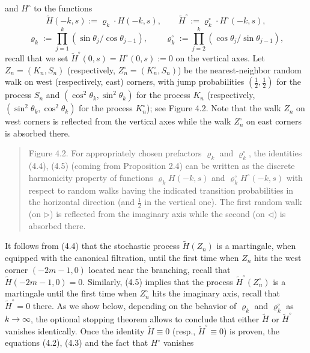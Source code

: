 \documentclass[11pt]{article}
\newcommand{\Htil}{\widetilde{H}}
\newcommand{\Htilo}{\widetilde{H}^{\circ}}
\begin{document}
and $H^{\circ}$ to the functions
\[
\Htil(-k,s) := \varrho_k\cdot H(-k,s),\qquad
\Htilo := \varrho^{\circ}_k\cdot H^{\circ}(-k,s),
\]
\[
\varrho_k := \prod_{j=1}^{k}(\sin\theta_j/\cos\theta_{j-1}),\qquad
\varrho^{\circ}_k := \prod_{j=2}^{k}(\cos\theta_j/\sin\theta_{j-1}),
\]
recall that we set $\Htilo(0,s) = H^{\circ}(0,s) := 0$ on the vertical axes.
Let $Z_n = (K_n,S_n)$ (respectively, $Z_n^{\circ} = (K_n^{\circ},S_n)$) be the
nearest-neighbor random walk on west (respectively, east) corners, with jump
probabilities $(\frac12,\frac12)$ for the process $S_n$ and
$(\cos^2\theta_k,\sin^2\theta_k)$ for the process $K_n$ (respectively,
$(\sin^2\theta_k,\cos^2\theta_k)$ for the process $K_n^{\circ}$); see Figure
4.2. Note that the walk $Z_n$ on west corners is reflected from the vertical
axes while the walk $Z_n^{\circ}$ on east corners is absorbed there.
\begin{quote}
\small Figure 4.2. For appropriately chosen prefactors $\varrho_k$ and
$\varrho^{\circ}_k$, the identities (4.4), (4.5) (coming from Proposition 2.4)
can be written as the discrete harmonicity property of functions
$\varrho_kH(-k,s)$ and $\varrho^{\circ}_kH^{\circ}(-k,s)$ with respect to
random walks having the indicated transition probabilities in the horizontal
direction (and $\frac12$ in the vertical one). The first random walk (on
$\triangleright$) is reflected from the imaginary axis while the second (on
$\triangleleft$) is absorbed there.
\end{quote}
It follows from (4.4) that the stochastic process $\Htil(Z_n)$ is a
martingale, when equipped with the canonical filtration, until the first time
when $Z_n$ hits the west corner $(-2m-1,0)$ located near the branching, recall
that $\Htil(-2m-1,0) = 0$. Similarly, (4.5) implies that the process
$\Htilo(Z_n^{\circ})$ is a martingale until the first time when $Z_n^{\circ}$
hits the imaginary axis, recall that $\Htilo = 0$ there. As we show below,
depending on the behavior of $\varrho_k$ and $\varrho^{\circ}_k$ as
$k \to \infty$, the optional stopping theorem allows to conclude that either
$\Htil$ or $\Htilo$ vanishes identically. Once the identity
$\Htil \equiv 0$ (resp., $\Htilo \equiv 0$) is proven, the equations (4.2),
(4.3) and the fact that $H^{\circ}$ vanishes
\end{document}
